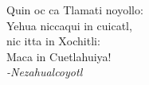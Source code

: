 
\vspace*{\fill}
\begin{flushright}
Quin oc ca Tlamati noyollo:\\
Yehua niccaqui in cuicatl,\\
nic itta in Xochitli:\\
Maca in Cuetlahuiya!\\
\emph{-Nezahualcoyotl}\par
\end{flushright}
\vspace*{\fill}
